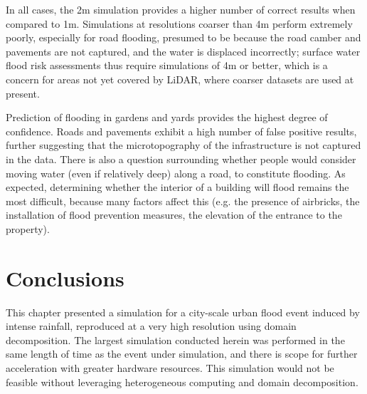 In all cases, the 2m simulation provides a higher number of correct results when compared to 1m. Simulations at resolutions coarser than 4m perform extremely poorly, especially for road flooding, presumed to be because the road camber and pavements are not captured, and the water is displaced incorrectly; surface water flood risk assessments thus require simulations of 4m or better, which is a concern for areas not yet covered by LiDAR, where coarser datasets are used at present.

Prediction of flooding in gardens and yards provides the highest degree of confidence. Roads and pavements exhibit a high number of false positive results, further suggesting that the microtopography of the infrastructure is not captured in the data. There is also a question surrounding whether people would consider moving water (even if relatively deep) along a road, to constitute flooding. As expected, determining whether the interior of a building will flood remains the most difficult, because many factors affect this (e.g. the presence of airbricks, the installation of flood prevention measures, the elevation of the entrance to the property).

\section{Conclusions}

This chapter presented a simulation for a city-scale urban flood event induced by intense rainfall, reproduced at a very high resolution using domain decomposition. The largest simulation conducted herein was performed in the same length of time as the event under simulation, and there is scope for further acceleration with greater hardware resources. This simulation would not be feasible without leveraging heterogeneous computing and domain decomposition.

